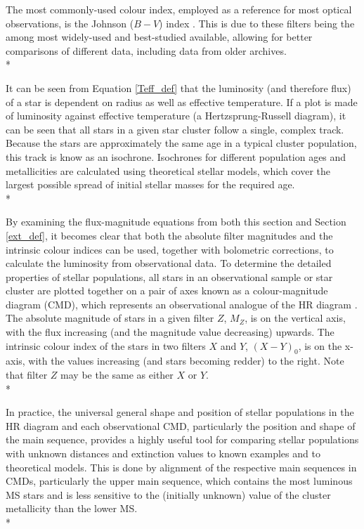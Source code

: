\documentclass[12pt, a4paper]{report}
\begin{document}
The most commonly-used colour index, employed as a reference for most optical observations, is the Johnson ($B-V$) index \citep{1953ApJ...117..313J}. This is due to these filters being the among most widely-used and best-studied available, allowing for better comparisons of different data, including data from older archives.\\*

It can be seen from Equation \ref{Teff_def} that the luminosity (and therefore flux) of a star is dependent on radius as well as effective temperature. If a plot is made of luminosity against effective temperature (a Hertzsprung-Russell diagram), it can be seen that all stars in a given star cluster follow a single, complex track. Because the stars are approximately the same age in a typical cluster population, this track is know as an isochrone. Isochrones for different population ages and metallicities are calculated using theoretical stellar models, which cover the largest possible spread of initial stellar masses for the required age.\\*

By examining the flux-magnitude equations from both this section and Section \ref{ext_def}, it becomes clear that both the absolute filter magnitudes and the intrinsic colour indices can be used, together with bolometric corrections, to calculate the luminosity from observational data. To determine the detailed properties of stellar populations, all stars in an observational sample or star cluster are plotted together on a pair of axes known as a colour-magnitude diagram (CMD), which represents an observational analogue of the HR diagram \citep{2005ARA&A..43..293B}. The absolute magnitude of stars in a given filter $Z$, $M_{Z}$, is on the vertical axis, with the flux increasing (and the magnitude value decreasing) upwards. The intrinsic colour index of the stars in two filters $X$ and $Y$, $(X-Y)_{0}$, is on the x-axis, with the values increasing (and stars becoming redder) to the right. Note that filter $Z$ may be the same as either $X$ or $Y$.\\*

In practice, the universal general shape and position of stellar populations in the HR diagram and each observational CMD, particularly the position and shape of the main sequence, provides a highly useful tool for comparing stellar populations with unknown distances and extinction values to known examples and to theoretical models. This is done by alignment of the respective main sequences in CMDs, particularly the upper main sequence, which contains the most luminous MS stars and is less sensitive to the (initially unknown) value of the cluster metallicity than the lower MS. \\*
\end{document}
